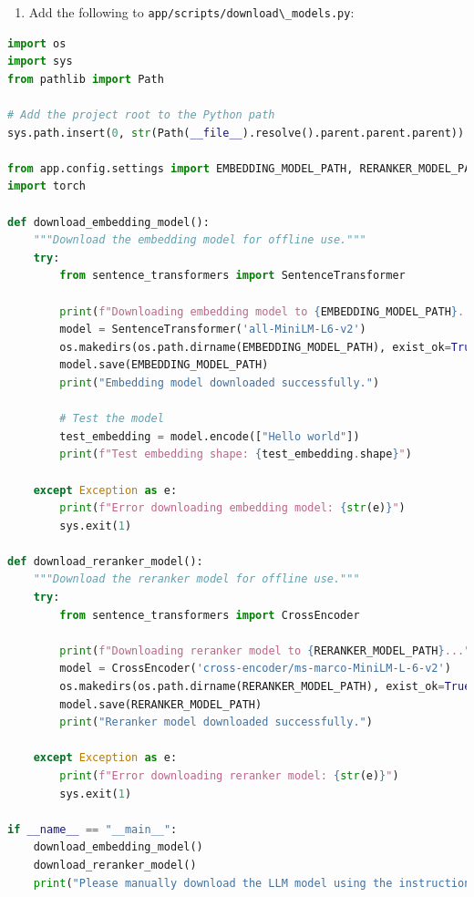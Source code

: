 \documentclass[
  screen,review,acmlarge]{acmart}
\newcommand{\passthrough}[1]{#1}
\providecommand{\tightlist}{%
  \setlength{\itemsep}{0pt}\setlength{\parskip}{0pt}}
\begin{document}
\begin{enumerate}
\def\labelenumi{\arabic{enumi}.}
\setcounter{enumi}{3}
\tightlist
\item
  Add the following to \passthrough{\lstinline!app/scripts/download\_models.py!}:
\end{enumerate}

\begin{lstlisting}[language=Python]
import os
import sys
from pathlib import Path

# Add the project root to the Python path
sys.path.insert(0, str(Path(__file__).resolve().parent.parent.parent))

from app.config.settings import EMBEDDING_MODEL_PATH, RERANKER_MODEL_PATH
import torch

def download_embedding_model():
    """Download the embedding model for offline use."""
    try:
        from sentence_transformers import SentenceTransformer
        
        print(f"Downloading embedding model to {EMBEDDING_MODEL_PATH}...")
        model = SentenceTransformer('all-MiniLM-L6-v2')
        os.makedirs(os.path.dirname(EMBEDDING_MODEL_PATH), exist_ok=True)
        model.save(EMBEDDING_MODEL_PATH)
        print("Embedding model downloaded successfully.")
        
        # Test the model
        test_embedding = model.encode(["Hello world"])
        print(f"Test embedding shape: {test_embedding.shape}")
        
    except Exception as e:
        print(f"Error downloading embedding model: {str(e)}")
        sys.exit(1)

def download_reranker_model():
    """Download the reranker model for offline use."""
    try:
        from sentence_transformers import CrossEncoder
        
        print(f"Downloading reranker model to {RERANKER_MODEL_PATH}...")
        model = CrossEncoder('cross-encoder/ms-marco-MiniLM-L-6-v2')
        os.makedirs(os.path.dirname(RERANKER_MODEL_PATH), exist_ok=True)
        model.save(RERANKER_MODEL_PATH)
        print("Reranker model downloaded successfully.")
        
    except Exception as e:
        print(f"Error downloading reranker model: {str(e)}")
        sys.exit(1)

if __name__ == "__main__":
    download_embedding_model()
    download_reranker_model()
    print("Please manually download the LLM model using the instructions in the README.")
\end{lstlisting}
\end{document}
